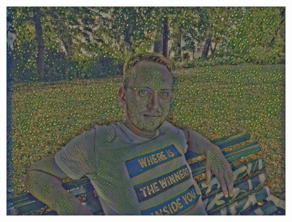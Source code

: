 \begin{figure}[H]
\begin{subfigure}[h]{0.32\textwidth}
        \includegraphics[width=\textwidth]{resources/content/experiments/ich-vgg16_portrait_of_joseph_roulin.jpg}
    \end{subfigure}



\end{figure}
